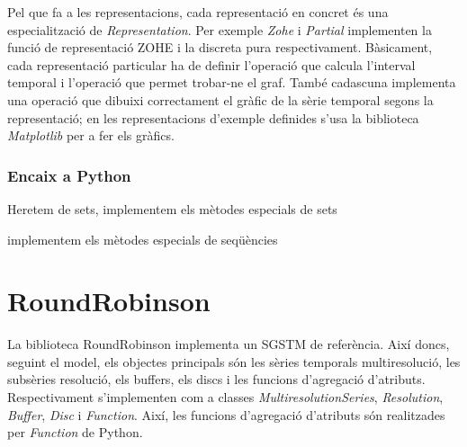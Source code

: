 Pel que fa a les representacions, cada representació en concret és una
especialització de \emph{Representation}. Per exemple \emph{Zohe} i
\emph{Partial} implementen la funció de representació ZOHE i la
discreta pura respectivament. 
Bàsicament, cada representació particular ha de definir l'operació que
calcula l'interval temporal i l'operació que permet trobar-ne el graf.
També cadascuna implementa una operació que dibuixi correctament el
gràfic de la sèrie temporal segons la representació; en les
representacions d'exemple definides s'usa la biblioteca
\emph{Matplotlib}  per a fer els gràfics.




\subsubsection{Encaix a Python}

\todo{}

Heretem de sets, implementem els mètodes especials de sets

implementem els mètodes especials de seqüències







\section{RoundRobinson}

La biblioteca RoundRobinson implementa un SGSTM de referència. Així
doncs, seguint el model, els objectes principals són les sèries
temporals multiresolució, les subsèries resolució, els buffers, els
discs i les funcions d'agregació d'atributs. Respectivament
s'implementen com a classes \emph{MultiresolutionSeries},
\emph{Resolution}, \emph{Buffer}, \emph{Disc} i \emph{Function}.
Així, les funcions d'agregació d'atributs són realitzades per
\emph{Function} de Python.


